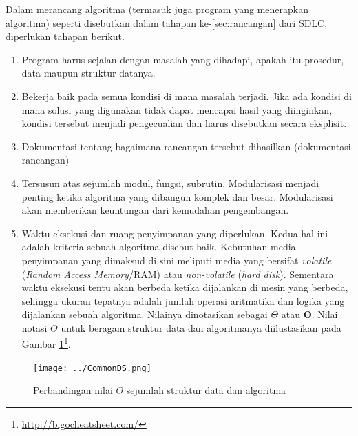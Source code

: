 Dalam merancang algoritma (termasuk juga program yang menerapkan algoritma) seperti disebutkan dalam tahapan ke-\ref{sec:rancangan} dari SDLC, diperlukan tahapan berikut.
\begin{enumerate}
\item Program harus sejalan dengan masalah yang dihadapi, apakah itu prosedur, data maupun struktur datanya.
\item Bekerja baik pada semua kondisi di mana masalah terjadi. Jika ada kondisi di mana solusi yang digunakan tidak dapat mencapai hasil yang diinginkan, kondisi tersebut menjadi pengecualian dan harus disebutkan secara eksplisit.
\item Dokumentasi tentang bagaimana rancangan tersebut dihasilkan (dokumentasi rancangan)
\item Tersusun atas sejumlah modul, fungsi, subrutin. Modularisasi menjadi penting ketika algoritma yang dibangun komplek dan besar. Modularisasi akan memberikan keuntungan dari kemudahan pengembangan.
\item Waktu eksekusi dan ruang penyimpanan yang diperlukan. Kedua hal ini adalah kriteria sebuah algoritma disebut baik. Kebutuhan media penyimpanan yang dimaksud di sini meliputi media yang bersifat \textit{volatile} (\textit{Random Access Memory}/RAM) atau \textit{non-volatile} (\textit{hard disk}). Sementara waktu eksekusi tentu akan berbeda ketika dijalankan di mesin yang berbeda, sehingga ukuran tepatnya adalah jumlah operasi aritmatika dan logika yang dijalankan sebuah algoritma. Nilainya dinotasikan sebagai $\Theta$ atau \textbf{O}. Nilai notasi $\Theta$ untuk beragam struktur data dan algoritmanya diilustasikan pada Gambar \ref{fig:bigOh}\footnote{\url{http://bigocheatsheet.com/}}.
\end{enumerate}

\begin{figure}[H]
\centering
\texttt{[image: ../CommonDS.png]}
\caption{Perbandingan nilai $\Theta$ sejumlah struktur data dan algoritma}
\label{fig:bigOh}
\end{figure}

